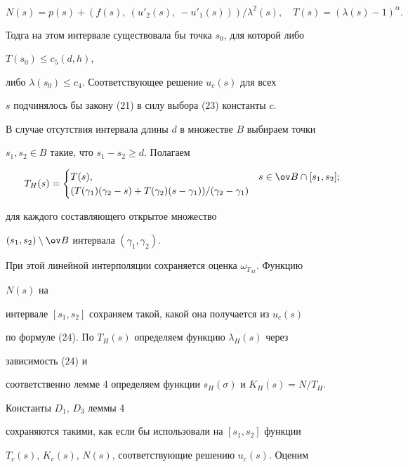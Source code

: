 \begin{pf}
\begin{equation}
N(s)=p(s)+(f(s),\ (u'_2(s),\ -u'_1(s)))/\lambda^2(s),\quad 


T(s)=(\lambda(s)-1)^\alpha. 


\end{equation} 


Тодга на этом интервале существовала бы точка $s_0$, для которой либо 


$T(s_0)\le c_5(d,h)$, 


либо $\lambda(s_0)\le c_4$. Соответствующее решение $u_c(s)$ для всех 


$s$ подчинялось бы закону (21) в силу выбора (23) константы $c$. 


 


В случае отсутствия интервала длины $d$ в множестве $B$ выбираем точки 


$s_1,s_2\in B$ такие, что $s_1-s_2\ge d$. Полагаем 


$$ 


T_H(s)= 


\begin{cases} 


T(s),& s\in\ov B\cap[s_1,s_2];\\ 


(T(\gamma_1)(\gamma_2-s)+T(\gamma_2)(s-\gamma_1))/ 


(\gamma_2-\gamma_1)


\end{cases} 


$$ 


для каждого составляющего открытое множество


$(s_1,s_2)\setminus\ov B$ интервала $(\gamma_1,\gamma_2)$.


При этой линейной интерполяции сохраняется оценка $\omega_{T_M}$. Функцию 


$N(s)$ на 


интервале $[s_1,s_2]$ сохраняем такой, какой она получается из $u_c(s)$ 


по формуле (24). По $T_H(s)$ определяем функцию $\lambda_H(s)$ через 


зависимость (24) и 


соответственно лемме 4 определяем функции $s_H(\sigma)$ и $K_H(s)=N/T_H$. 


Константы $D_1$, $D_3$ леммы 4 


сохраняются такими, как если бы использовали на $[s_1,s_2]$ функции 


$T_c(s)$, $K_c(s)$, $N(s)$, соответствующие решению $u_c(s)$. Оценим 



\end{pf}
